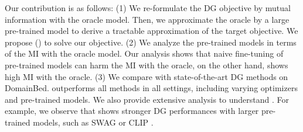 Our contribution is as follows: (1) We re-formulate the DG objective by mutual information with the oracle model. Then, we approximate the oracle by a large pre-trained model to derive a tractable approximation of the target objective. We propose \fullname{} (\method{}) to solve our objective. (2) We analyze the pre-trained models in terms of the MI with the oracle model. Our analysis shows that naive fine-tuning of pre-trained models can harm the MI with the oracle, on the other hand, \method{} shows high MI with the oracle.
(3) We compare \method{} with state-of-the-art DG methods on DomainBed. \method{} outperforms all methods in all settings, including varying optimizers and pre-trained models. We also provide extensive analysis to understand \method{}. For example, we observe that \method{} shows stronger DG performances with larger pre-trained models, such as SWAG \cite{singh2022swag} or CLIP \cite{radford2021clip}.


